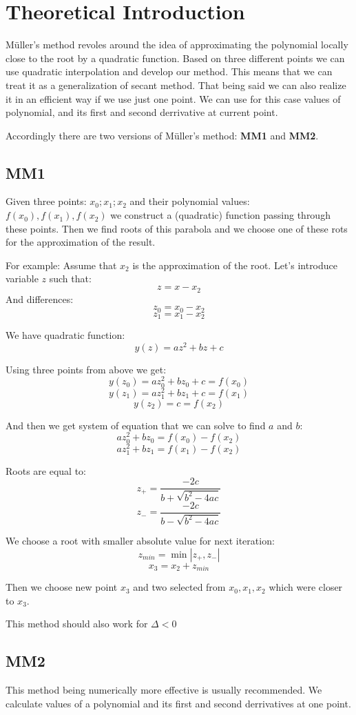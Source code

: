 \section{Theoretical Introduction}
M{\"u}ller's method revoles around the idea of approximating the polynomial locally close to the root by a quadratic function. Based on three different points we can use quadratic interpolation and develop our method. This means that we can treat it as a generalization of secant method. That being said we can also realize it in an efficient way if we use just one point. We can use for this case values of polynomial, and its first and second derrivative at current point.

Accordingly there are two versions of M{\"u}ller's method: \textbf{MM1} and \textbf{MM2}.

\subsection{MM1}
Given three points: $x_0; x_1; x_2$ and their polynomial values: $f(x_0), f(x_1), f(x_2)$ we construct a (quadratic) function passing through these points. Then we find roots of this parabola and we choose one of these rots for the approximation of the result.

For example:
Assume that $x_2$ is the approximation of the root.
Let's introduce variable $z$ such that:
\[ z = x - x_2 \]
And differences:
\[ z_0 = x_0 - x_2 \]
\[ z_1 = x_1 - x_2 \]

We have quadratic function:
\[ y(z) = az^2 + bz + c \]

Using three points from above we get:
\[ y(z_0) = az_0^2 + bz_0 + c = f(x_0) \]
\[ y(z_1) = az_1^2 + bz_1 + c = f(x_1) \]
\[ y(z_2) = c = f(x_2) \]

And then we get system of equation that we can solve to find $a$ and $b$:
\[ az_0^2 + bz_0 = f(x_0) - f(x_2) \]
\[ az_1^2 + bz_1 = f(x_1) - f(x_2) \]

Roots are equal to:
\[ z_+ = \frac{-2c}{b+\sqrt{b^2 - 4ac}} \]
\[ z_- = \frac{-2c}{b-\sqrt{b^2 - 4ac}} \]

We choose a root with smaller absolute value for next iteration:
\[ z_{min} = \min{|z_+, z_-|} \]
\[ x_3 = x_2 + z_{min} \]

Then we choose new point $x_3$ and two selected from $x_0, x_1, x_2$ which were closer to $x_3$.

This method should also work for $\Delta < 0 $


\subsection{MM2}
This method being numerically more effective is usually recommended.
We calculate values of a polynomial and its first and second derrivatives at one point.

